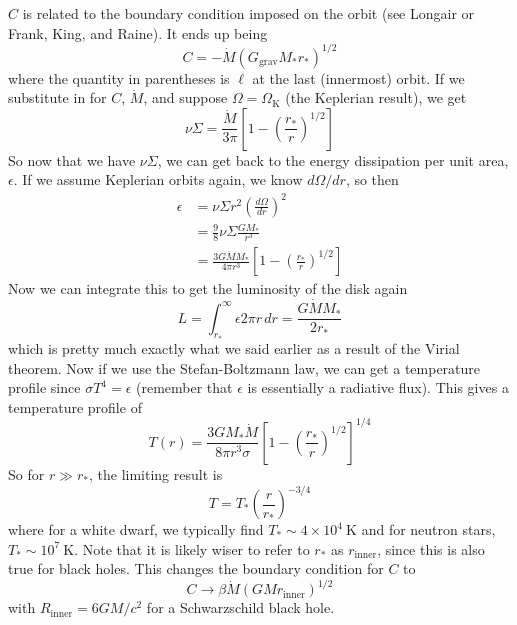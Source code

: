 \documentclass[10pt]{article}
\numberwithin{equation}{section}
\begin{document}
	$C$ is related to the boundary condition imposed on the orbit (see Longair or Frank, King, and Raine). It ends up being
	\begin{equation}
		\label{eq:disk:26} C = -\dot{M}(G_{\mathrm{grav}}M_*r_*)^{1/2}
	\end{equation}
	where the quantity in parentheses is $\ell$ at the last (innermost) orbit. If we substitute in for $C$, $\dot{M}$, and suppose $\Omega = \Omega_{\mathrm{K}}$ (the Keplerian result), we get
	\begin{equation}
		\label{eq:disk:27} \boxed{\nu\Sigma = \frac{\dot{M}}{3\pi}\left[1-\left(\frac{r_*}{r}\right)^{1/2}\right]}
	\end{equation}
	So now that we have $\nu\Sigma$, we can get back to the energy dissipation per unit area, $\epsilon$. If we assume Keplerian orbits again, we know $d\Omega/dr$, so then
	\begin{align}
		\label{eq:disk:28} \epsilon &= \nu \Sigma r^2 \left(\frac{d\Omega}{dr}\right)^2\\
		\label{eq:disk:29} &= \frac{9}{8}\nu \Sigma \frac{GM_*}{r^3}\\
		\label{eq:disk:30} &= \frac{3G\dot{M} M_*}{4\pi r^3}\left[1-\left(\frac{r_*}{r}\right)^{1/2}\right]
	\end{align}
	Now we can integrate this to get the luminosity of the disk again
	\begin{equation}
		\label{eq:disk:31} L = \int_{r_*}^\infty \epsilon 2\pi r\,dr = \frac{G\dot{M} M_*}{2r_*}
	\end{equation}
	which is pretty much exactly what we said earlier as a result of the Virial theorem. Now if we use the Stefan-Boltzmann law, we can get a temperature profile since $\sigma T^4 = \epsilon$ (remember that $\epsilon$ is essentially a radiative flux). This gives a temperature profile of
	\begin{equation}
		\label{eq:disk:32} T(r) = \frac{3GM_*\dot{M}}{8\pi r^3\sigma}\left[1-\left(\frac{r_*}{r}\right)^{1/2}\right]^{1/4}
	\end{equation}
	So for $r \gg r_*$, the limiting result is
	\begin{equation}
		\label{eq:disk:33} T = T_*\left(\frac{r}{r_*}\right)^{-3/4}
	\end{equation}
	where for a white dwarf, we typically find $T_*\sim 4\times 10^4\ \mathrm{K}$ and for neutron stars, $T_*\sim 10^7\ \mathrm{K}$. Note that it is likely wiser to refer to $r_*$ as $r_{\mathrm{inner}}$, since this is also true for black holes. This changes the boundary condition for $C$ to 
	\begin{equation}
		\label{eq:disk:34} C\to \beta \dot{M}\left(GM r_{\mathrm{inner}}\right)^{1/2}
	\end{equation}
	with $R_{\mathrm{inner}}=6GM/c^2$ for a Schwarzschild black hole.\\
	
\end{document}
